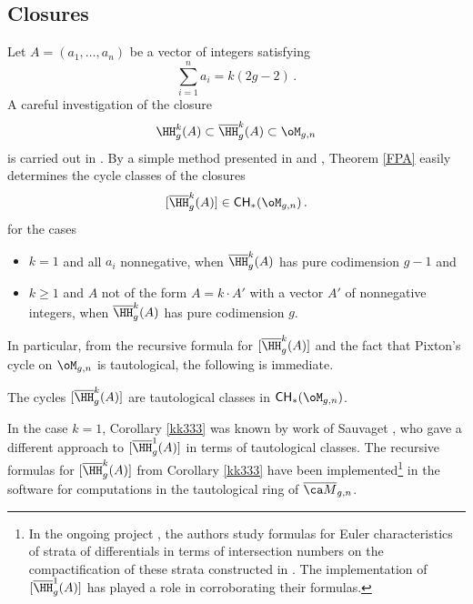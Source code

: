 \subsection{Closures}\label{clozzz}
Let $A=(a_1,\ldots, a_n)$ be a vector of integers satisfying
$$\sum_{i=1}^n a_i =k(2g-2)\, .$$
A careful investigation of the closure%
$$\HH^k_g(A) \subset \overline{\HH}^k_g(A) \subset \oM_{g,n}$$
is carried out in \cite{Bainbridge2018Compactificatio,Bainbridge2019Strata-of-k-dif}.
By a simple method presented in \cite[Appendix A]{Farkas2016The-moduli-spac} and \cite[Section 3.4]{Schmitt2016Dimension-theor},
Theorem \ref{FPA} easily determines the cycle classes of the
closures
$$ [\overline{\HH}^k_g(A)] \in \mathsf{CH}_{*} (\oM_{g,n})\, .$$
for the cases
\begin{itemize}
    \item $k=1$ and all $a_i$ nonnegative, when $\overline{\HH}^k_g(A)$ has pure codimension $g-1$ and
    \item $k\geq 1$ and $A$ not of the form $A = k \cdot A'$ with a vector $A'$ of nonnegative integers, when $\overline{\HH}^k_g(A)$ has pure codimension $g$. %
\end{itemize}
In particular, from the recursive formula for $[\overline{\HH}^k_g(A)]$ and the fact that Pixton's cycle on $\oM_{g,n}$ is tautological, the following is immediate.
\begin{corollary}
\notready\label{kk333}
The cycles $[\overline{\HH}^k_g(A)]$ are tautological classes in $\mathsf{CH}_*(\oM_{g,n})$.
\end{corollary}
In the case $k=1$, Corollary \ref{kk333} was known by work of Sauvaget  \cite{Sauvaget2017Cohomology-clas}, who gave a different approach to $[\overline{\HH}^1_g(A)]$ in terms of tautological classes.
The recursive formulas for $[\overline{\HH}^k_g(A)]$ from
Corollary \ref{kk333} have been implemented\footnote{In the ongoing project \cite{CMZ20}, the authors study formulas for Euler characteristics of strata of differentials in terms of intersection numbers on the compactification of these strata constructed in \cite{BCGGM3}. The
implementation of $[\overline{\HH}^1_g(A)]$ has played
a role in corroborating their formulas.}
in the software \cite{admcycles} for computations in the tautological ring of $\Mbar_{g,n}$.

